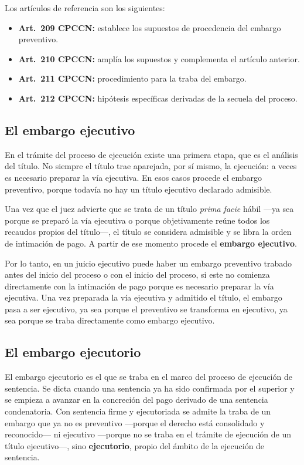 \documentclass[12pt,oneside]{book}
\begin{document}
Los artículos de referencia son los siguientes:
\begin{itemize}
    \item \textbf{Art.\ 209 CPCCN:} establece los supuestos de procedencia del embargo preventivo.
    \item \textbf{Art.\ 210 CPCCN:} amplía los supuestos y complementa el artículo anterior.
    \item \textbf{Art.\ 211 CPCCN:} procedimiento para la traba del embargo.
    \item \textbf{Art.\ 212 CPCCN:} hipótesis específicas derivadas de la secuela del proceso.
\end{itemize}

\subsection{El embargo ejecutivo}

En el trámite del proceso de ejecución existe una primera etapa, que es el análisis del título. No siempre el título trae aparejada, por sí mismo, la ejecución: a veces es necesario preparar la vía ejecutiva. En esos casos procede el embargo preventivo, porque todavía no hay un título ejecutivo declarado admisible.

Una vez que el juez advierte que se trata de un título \textit{prima facie} hábil ---ya sea porque se preparó la vía ejecutiva o porque objetivamente reúne todos los recaudos propios del título---, el título se considera admisible y se libra la orden de intimación de pago. A partir de ese momento procede el \textbf{embargo ejecutivo}.

Por lo tanto, en un juicio ejecutivo puede haber un embargo preventivo trabado antes del inicio del proceso o con el inicio del proceso, si este no comienza directamente con la intimación de pago porque es necesario preparar la vía ejecutiva. Una vez preparada la vía ejecutiva y admitido el título, el embargo pasa a ser ejecutivo, ya sea porque el preventivo se transforma en ejecutivo, ya sea porque se traba directamente como embargo ejecutivo.

\subsection{El embargo ejecutorio}

El embargo ejecutorio es el que se traba en el marco del proceso de ejecución de sentencia. Se dicta cuando una sentencia ya ha sido confirmada por el superior y se empieza a avanzar en la concreción del pago derivado de una sentencia condenatoria. Con sentencia firme y ejecutoriada se admite la traba de un embargo que ya no es preventivo ---porque el derecho está consolidado y reconocido--- ni ejecutivo ---porque no se traba en el trámite de ejecución de un título ejecutivo---, sino \textbf{ejecutorio}, propio del ámbito de la ejecución de sentencia.
\end{document}

